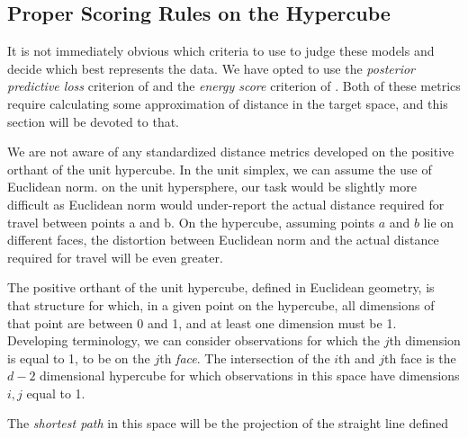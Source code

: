 \subsection{Proper Scoring Rules on the Hypercube}
It is not immediately obvious which criteria to use to judge these models and decide which best
  represents the data.  We have opted to use the \emph{posterior predictive loss} criterion of
  \cite{gelfand1998} and the \emph{energy score} criterion of \cite{gneiting2007}.  Both of these
  metrics require calculating some approximation of distance in the target space, and this
  section will be devoted to that.

We are not aware of any standardized distance metrics developed on the positive orthant of the
  unit hypercube.  In the unit simplex, we can assume the use of Euclidean norm.  on the unit
  hypersphere, our task would be slightly more difficult as Euclidean norm would under-report
  the actual distance required for travel between points a and b.  On the hypercube, assuming
  points $a$ and $b$ lie on different faces, the distortion between Euclidean norm and the
  actual distance required for travel will be even greater.

The positive orthant of the unit hypercube, defined in Euclidean geometry, is that structure for
  which, in a given point on the hypercube, all dimensions of that point are between 0 and 1, and
  at least one dimension must be 1.  Developing terminology, we can consider observations for which
  the $j$th dimension is equal to 1, to be on the $j$th \emph{face}.  The intersection of the $i$th
  and $j$th face is the $d-2$ dimensional hypercube for which observations in this space have
  dimensions $i,j$ equal to 1.

The \emph{shortest path} in this space will be the projection of the straight line defined 



